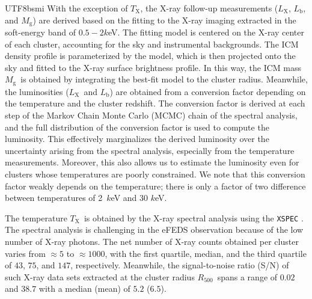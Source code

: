 \documentclass[longauth]{aa}
\newcommand{\Rfiveoo}{\ensuremath{R_{500}}}
\newcommand{\Lx}{\ensuremath{L_{\mathrm{X}}}}
\newcommand{\Lb}{\ensuremath{L_{\mathrm{b}}}}
\newcommand{\Tx}{\ensuremath{T_{\mathrm{X}}}}
\newcommand{\Mg}{\ensuremath{M_{\mathrm{g}}}}
\begin{document}
\begin{CJK*}{UTF8}{bsmi}
With the exception of \Tx, the X-ray follow-up measurements (\Lx, \Lb, and \Mg) are derived based on the fitting to the X-ray imaging extracted in the soft-energy band of $0.5-2k$eV.
The fitting model is centered on the X-ray center of each cluster, accounting for the sky and instrumental backgrounds.
The ICM density profile is parameterized by the 
\citet{vikhlinin06} model,
which is then projected onto the sky and fitted to the X-ray surface brightness profile.
In this way, the ICM mass \Mg\ is obtained by integrating the best-fit model to the cluster radius.
Meanwhile, the luminosities (\Lx\ and \Lb) are obtained from a conversion factor depending on the temperature and the cluster redshift.
The conversion factor is derived at each step of the Markov Chain Monte Carlo (MCMC) chain of the spectral analysis, and the full distribution of the conversion factor is used to compute the luminosity.
This effectively marginalizes the derived luminosity over the uncertainty arising from the spectral analysis, especially from the temperature measurements.
Moreover, this also allows us to estimate the luminosity even for clusters whose temperatures are poorly constrained.
We note that this conversion factor weakly depends on the temperature; there is only a factor of two difference between temperatures of 2~$k$eV and 30 $k$eV.


The temperature \Tx\ is obtained by the X-ray spectral analysis using the \texttt{XSPEC} \citep{arnaud96}.
The spectral analysis is challenging in the eFEDS observation because of the low number of X-ray photons.
The net number of X-ray counts obtained per cluster varies from $\approx5$ to $\approx1000$, 
with the first quartile, median, and the third quartile of $43$, $75$, and $147$, respectively.
Meanwhile, the signal-to-noise ratio (S/N) of such X-ray data sets extracted at the cluster radius \Rfiveoo\ spans a range of $0.02$ and $38.7$ with a median (mean) of $5.2$ ($6.5$).



\end{CJK*}
\end{document}
